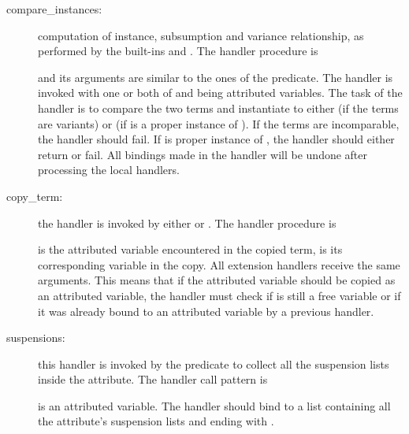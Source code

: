 \begin{description}
\item [compare_instances:]
  computation of instance, subsumption
and variance relationship, as performed by the built-ins
 and
.
The handler procedure is
\begin{quote}
\end{quote}
and its arguments are similar to the ones of the
predicate.
The handler is invoked with one or both of  and  being
attributed variables. The task of the handler is to compare the two terms
and instantiate  to either \notation{=} (if the terms are variants)
or \notation{<}
(if  is a proper instance of ). If the terms are
incomparable, the handler should fail. If  is proper instance
of , the handler should either return \notation{>} or fail.
All bindings made in the handler will be undone after processing
the local handlers.

\item [copy_term:]
  the handler is invoked by either
 or
.
The handler procedure is
\begin{quote}
\end{quote}
 is the attributed variable encountered in the
copied term,  is its corresponding variable in the copy.
All extension handlers receive the same arguments.
This means that if the attributed variable should be copied as
an attributed variable, the handler must check if  is still
a free variable or if it was already bound to an attributed variable by a
previous handler.

\item [suspensions:]
  this handler is invoked by the
 predicate
to collect all the suspension lists inside the attribute.
The handler call pattern is
\begin{quote}
\end{quote}
 is an attributed variable. The handler should bind
 to a list containing all the attribute's
suspension lists and ending with .



\end{description}
